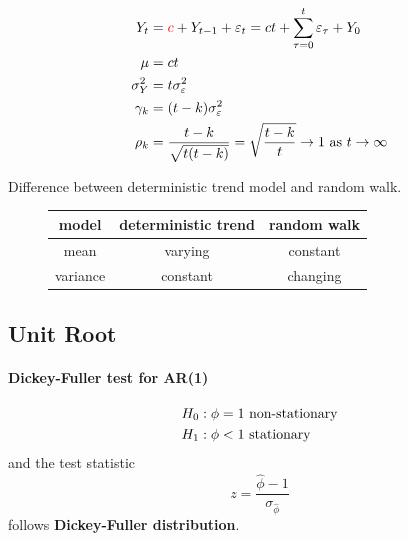 \documentclass[11pt]{article}
\begin{document}
    	    \begin{example}
    	        \begin{align}
    	            Y_t &= \textcolor{red}{c} + Y_{t-1} + \varepsilon_t = ct + \sum_{\tau=0}^{t} \varepsilon_\tau + Y_0 \\
    	            \mu &= ct \\
    	            \sigma_Y^2 &= t \sigma_\varepsilon^2 \\
    	            \gamma_k &= (t-k) \sigma_\varepsilon^2 \\
    	            \rho_k &= \frac{t-k}{\sqrt{t (t-k)}} = \sqrt{\frac{t-k}{t}} \to 1 \text{{ as }} t \to \infty
    	        \end{align}
    	    \end{example}
    	    
    	    \begin{remark}
    	        Difference between deterministic trend model and random walk.
    	        \begin{figure}[h]
    	            \centering
        	        \begin{tabular}{c|c|c}
        	             model & deterministic trend & random walk \\
        	             \hline
        	             mean & varying & constant \\
        	             \hline
        	             variance & constant & changing
        	        \end{tabular}
    	        \end{figure}
    	    \end{remark}
    	    
    	\subsection{Unit Root}
    	    \paragraph{Dickey-Fuller test for AR(1)}
    	        \begin{align}
    	            H_0 &: \phi = 1 \text{{ non-stationary}} \\
    	            H_1 &: \phi < 1 \text{{ stationary}}
    	        \end{align}
    	       and the test statistic 
    	       \begin{equation}
    	           z = \frac{\hat{\phi} - 1}{\sigma_{\hat{\phi}}}
    	       \end{equation}
    	       follows \textbf{Dickey-Fuller distribution}.
    	   
\end{document}
